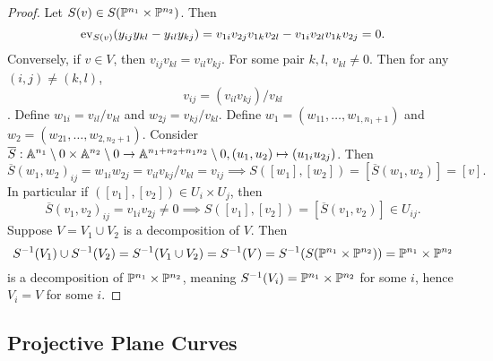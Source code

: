         \begin{proof}
            Let $S(v)\in S(\mathbb{P}^{n_1}\times \mathbb{P}^{n_2})$. Then 
            $$\mathrm{ev}_{S(v)}(y_{ij}y_{kl}-y_{il}y_{kj})=v_{1i}v_{2j}v_{1k}v_{2l}-v_{1i}v_{2l}v_{1k}v_{2j}=0.$$
            Conversely, if $v\in V$, then $v_{ij}v_{kl}=v_{il}v_{kj}$. For some pair $k,l$, $v_{kl}\neq0$. Then for any $(i,j)\neq (k,l)$, 
            $$v_{ij}=(v_{il}v_{kj})/v_{kl}$$. Define $w_{1i} = v_{il}/v_{kl}$ and $w_{2j}=v_{kj}/v_{kl}$. Define $w_1 = (w_{11},\dots,w_{1,n_1+1})$ and $w_2 = (w_{21},\dots,w_{2,n_2+1})$. Consider $\overline{S}: \mathbb{A}^{n_1}\setminus0\times \mathbb{A}^{n_2}\setminus0 \rightarrow \mathbb{A}^{n_1+n_2+n_1n_2}\setminus0, (u_1,u_2)\mapsto (u_{1i}u_{2j})$. Then 
            $$\overline{S}(w_1,w_2)_{ij}= w_{1i}w_{2j}= v_{il}v_{kj}/v_{kl} = v_{ij}\implies S([w_1],[w_2])=[\overline{S}(w_1,w_2)] = [v].$$
            In particular if $([v_1],[v_2])\in U_i\times U_j$, then 
            $$\overline{S}(v_1,v_2)_{ij}=v_{1i}v_{2j}\neq 0 \implies S([v_1],[v_2])=[\overline{S}(v_1,v_2)]\in U_{ij}.$$
            Suppose $V=V_1\cup V_2$ is a decomposition of $V$. Then 
            $$S^{-1}(V_1)\cup S^{-1}(V_2) = S^{-1}(V_1\cup V_2) = S^{-1}(V)=S^{-1}(S(\mathbb{P}^{n_1}\times \mathbb{P}^{n_2})) = \mathbb{P}^{n_1}\times \mathbb{P}^{n_2}$$
            is a decomposition of $\mathbb{P}^{n_1}\times \mathbb{P}^{n_2}$, meaning $S^{-1}(V_i) = \mathbb{P}^{n_1}\times \mathbb{P}^{n_2}$ for some $i$, hence $V_i= V$ for some $i$.
        \end{proof}
\subsection{Projective Plane Curves}
